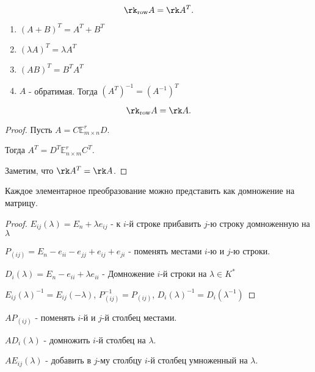 \begin{statement} \thmslashn

    \[ \rk_{\text{row}} A = \rk A^{T} .\] 
\end{statement}
\begin{properties} \thmslashn

    \begin{enumerate}
        \item $(A+B)^{T} = A^{T} + B^{T}$ 
        \item $(\lambda A)^{T} = \lambda A^{T}$ 
        \item $(AB)^{T} = B^{T}A^{T}$ 
        \item $A$ - обратимая. Тогда $(A^{T})^{-1} = (A^{-1})^{T}$
    \end{enumerate}
\end{properties}
\begin{statement} \thmslashn

    \[ \rk_{\text{row}} A = \rk A .\] 
    \begin{proof} \thmslashn
    
        Пусть $A = C \mathbb{E}_{m \times n}^{r}D$.

        Тогда $A^{T} = D^{T}\mathbb{E}_{n \times m}^{r}C^{T}$.

        Заметим, что $\rk A^{T} = \rk A$.
    \end{proof}
\end{statement}
\begin{statement} \thmslashn

    Каждое элементарное преобразование можно представить как домножение на матрицу.
    \begin{proof} \thmslashn
    
        $E_{ij}(\lambda) = E_{n} + \lambda e_{ij}$ - к $i$-й строке прибавить $j$-ю строку домноженную на $\lambda$
        
        $P_{(ij)} = E_{n} - e_{ii} - e_{jj} + e_{ij} + e_{ji}$ - поменять местами $i$-ю и  $j$-ю строки.

        $D_{i}(\lambda) = E_{n} - e_{ii} + \lambda e_{ii}$ - Домножение $i$-й строки на $\lambda\in K^{*}$

        $E_{ij}(\lambda)^{-1} = E_{ij}(-\lambda)$, $P_{(ij)}^{-1} = P_{(ij)}$, $D_{i}(\lambda)^{-1} = D_{i}\left( \lambda^{-1} \right) $
    \end{proof}
\end{statement}
\begin{remark} \thmslashn

    $AP_{(ij)}$ - поменять $i$-й и $j$-й столбец местами.
    
    $AD_{i}(\lambda)$ - домножить $i$-й столбец на $\lambda$.

    $AE_{ij}(\lambda)$ - добавить в $j$-му столбцу $i$-й столбец умноженный на $\lambda$.
\end{remark}
